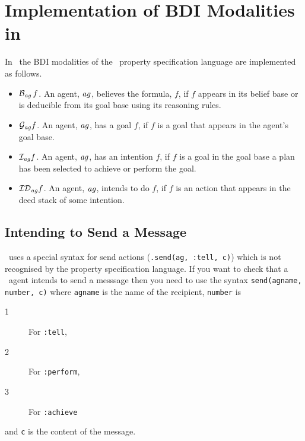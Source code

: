\section{Implementation of BDI Modalities in \gwendolen}
\label{s:impl_bdi}

In \gwendolen\ the BDI modalities of the \ajpf\ property specification language are implemented as follows.

\begin{itemize}
\item $\mathrm{{\cal B}}_{\mathit{ag}} \, f$.  An agent, $\mathit{ag}$, believes the formula, $f$, if $f$ appears in its belief base or is deducible from its goal base using its reasoning rules.
\item $\mathrm{{\cal G}}_{\mathit{ag}} f$.  An agent, $\mathit{ag}$, has a goal $f$, if $f$ is a goal that appears in the agent's goal base.
\item $\mathrm{{\cal I}}_{\mathit{ag}} f$.  An agent, $\mathit{ag}$, has an intention $f$, if $f$ is a goal in the goal base a plan has been selected to achieve or perform the goal.
\item $\mathrm{{\cal ID}}_{\mathit{ag}} f$.  An agent, $\mathit{ag}$, intends to do $f$, if $f$ is an action that appears in the deed stack of some intention.
\end{itemize}

\subsection{Intending to Send a Message}
\gwendolen\ uses a special syntax for send actions (\texttt{.send(ag, :tell, c)}) which is not recognised by the property specification language.  If you want to check that a \gwendolen\ agent intends to send a messsage then you need to use the syntax \texttt{send(agname, number, c)} where \texttt{agname} is the name of the recipient, \texttt{number} is
\begin{description}
\item[1] For \texttt{:tell},
\item[2] For \texttt{:perform},
\item[3] For \texttt{:achieve}
\end{description}
and \texttt{c} is the content of the message.

